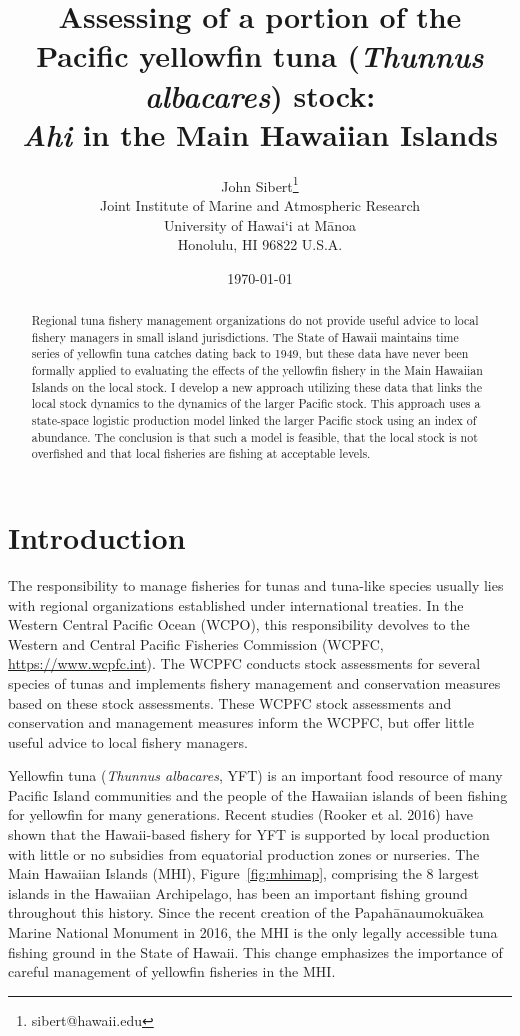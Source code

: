 \documentclass[12pt,letterpaper]{article}
\title{Assessing of a portion of the Pacific yellowfin tuna 
({\it Thunnus albacares}) stock:\\[0.125in]
{\it Ahi} in the Main Hawaiian Islands}
\author{
John Sibert\thanks{sibert@hawaii.edu}\\
Joint Institute of Marine and Atmospheric Research\\
University of Hawai`i at M\={a}noa\\
Honolulu, HI  96822 U.S.A.\\[0.125in]
\date{\today}
}
\newcommand\doublespacing{\baselineskip=1.6\normalbaselineskip}
\begin{document}
\maketitle


\begin{abstract}
Regional tuna fishery management organizations do not provide useful
advice to local fishery managers in small island jurisdictions. The
State of Hawaii maintains time series of yellowfin tuna catches dating
back to 1949, but these data have never been formally applied to
evaluating the effects of the yellowfin fishery in the Main Hawaiian
Islands on the local stock. I develop a new approach utilizing these
data that links the local stock dynamics to the dynamics of the larger
Pacific stock. This approach uses a state-space logistic production
model linked the larger Pacific stock using an index of abundance. The
conclusion is that such a model is feasible, that the local stock
is not overfished and that local fisheries are fishing at acceptable
levels.
\end{abstract}


\section*{Introduction}
The responsibility to manage fisheries for tunas and tuna-like
species usually
lies with regional organizations established under international treaties.
In the Western Central Pacific Ocean (WCPO), this responsibility devolves to
the Western and Central Pacific Fisheries Commission (WCPFC, 
\url{https://www.wcpfc.int}).
The WCPFC conducts stock assessments for several species of tunas and
implements fishery management and conservation measures based on
these stock assessments. These
WCPFC stock assessments and conservation and management measures
inform the WCPFC, but offer little useful advice to local fishery managers.

Yellowfin tuna ({\it Thunnus albacares}, YFT) is an important food resource
of many Pacific Island communities and the people of the Hawaiian
islands of been fishing for yellowfin for many generations. 
Recent studies (Rooker et al. 2016) have shown that the Hawaii-based
fishery for YFT is  supported by
local production with little or no subsidies from equatorial
production zones or nurseries.
The Main Hawaiian Islands (MHI), Figure~\ref{fig:mhimap},
comprising the 8 largest islands in the Hawaiian Archipelago,
has been an important fishing ground throughout this history.
Since the recent creation of the Papah\={a}naumoku\={a}kea Marine National
Monument in 2016, the MHI is the only legally accessible tuna fishing ground
in the State of Hawaii.
This change emphasizes the importance of careful management of yellowfin
fisheries in the MHI.
\end{document}
